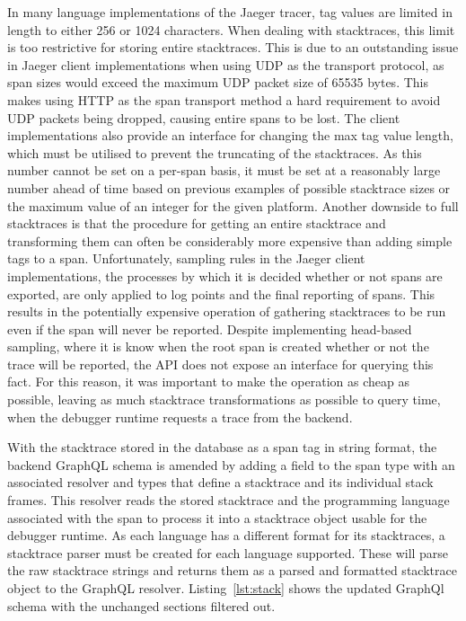 \documentclass[12pt,pdftex,titlepage]{report}
\begin{document}
                In many language implementations of the Jaeger tracer, tag values are limited in length to either 256 or 1024 characters. When dealing with stacktraces, this limit is too 
                restrictive for storing entire stacktraces. This is due to an outstanding issue in Jaeger client implementations when using UDP as the transport protocol, as span sizes
                would exceed the maximum UDP packet size of 65535 bytes\cite{udptagsize}. This makes using HTTP as the span transport method a hard requirement to avoid UDP packets being
                dropped, causing entire spans to be lost. The client implementations also provide an interface for changing the max tag value length, which must be utilised to prevent the truncating
                of the stacktraces. As this number cannot be set on a per-span basis, it must be set at a reasonably large number ahead of time based on previous examples of possible stacktrace sizes
                or the maximum value of an integer for the given platform. Another downside to full stacktraces is that the procedure for getting an entire stacktrace and transforming them can often 
                be considerably more expensive than adding simple tags to a span. Unfortunately, sampling rules in the Jaeger client implementations, the processes by which it is decided whether or 
                not spans are exported, are only applied to log points and the final reporting of spans. This results in the potentially expensive operation of gathering stacktraces to be run even if 
                the span will never be reported. Despite implementing head-based sampling, where it is know when the root span is created whether or not the trace will be reported, the API does not 
                expose an interface for querying this fact. For this reason, it was important to make the operation as cheap as possible, leaving as much stacktrace transformations as possible to 
                query time, when the debugger runtime requests a trace from the backend.

                With the stacktrace stored in the database as a span tag in string format, the backend GraphQL schema is amended by adding a field to the span type with an associated resolver and 
                types that define a stacktrace and its individual stack frames. This resolver reads the stored stacktrace and the programming language associated with the span to process it into a 
                stacktrace object usable for the debugger runtime. As each language has a different format for its stacktraces, a stacktrace parser must be created for each language supported. These
                will parse the raw stacktrace strings and returns them as a parsed and formatted stacktrace object to the GraphQL resolver. Listing~\ref{lst:stack} shows the updated GraphQl schema
                with the unchanged sections filtered out. 
\end{document}
